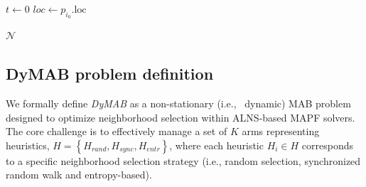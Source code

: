 \documentclass[review]{jair}
\begin{document}
\begin{algorithm}[t]
\caption{Entropy-Guided Walk}
\label{alg:entropy-random-walk}

$t \gets 0$\; 
$loc \gets p_{i_0}.\text{loc}$\;

\Return $\mathcal{N}$\;
\end{algorithm}


\subsection{DyMAB problem definition}
We formally define \emph{DyMAB} as a non-stationary (i.e., ~dynamic) MAB problem designed to optimize neighborhood selection within ALNS-based MAPF solvers. The core challenge is to effectively manage a set of $K$ arms representing heuristics, $H = \left\{H_{rand}, H_{sync}, H_{entr}\right\}$, where each heuristic $ H_i \in H $ corresponds to a specific neighborhood selection strategy (i.e., random selection, synchronized random walk and entropy-based).
\end{document}
